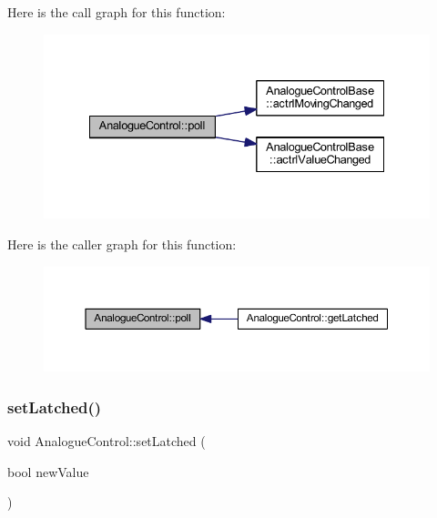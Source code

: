 Here is the call graph for this function\+:
\nopagebreak
\begin{figure}[H]
\begin{center}
\leavevmode
\includegraphics[width=335pt]{class_analogue_control_a5ec0b55a6abd8c73e61f86f2322251a5_cgraph}
\end{center}
\end{figure}
Here is the caller graph for this function\+:
\nopagebreak
\begin{figure}[H]
\begin{center}
\leavevmode
\includegraphics[width=350pt]{class_analogue_control_a5ec0b55a6abd8c73e61f86f2322251a5_icgraph}
\end{center}
\end{figure}
\mbox{\label{class_analogue_control_a3dd85b57a3fe8eceddcd2e4bbfce1ea9}} 
\subsubsection{\texorpdfstring{set\+Latched()}{setLatched()}}
{\footnotesize\ttfamily void Analogue\+Control\+::set\+Latched (\begin{DoxyParamCaption}\item[{bool}]{new\+Value }\end{DoxyParamCaption})\hspace{0.3cm}{\ttfamily [inline]}}



